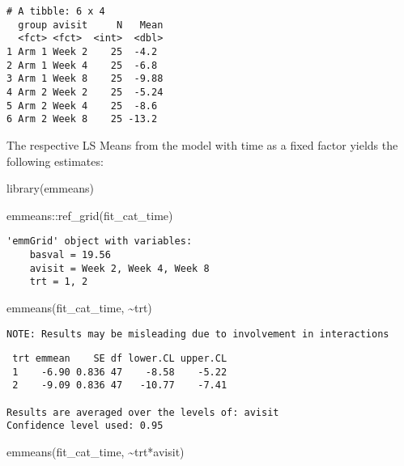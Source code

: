 \documentclass[
  letterpaper,
  DIV=11,
  numbers=noendperiod]{scrreprt}
\newenvironment{Shaded}{\begin{snugshade}}{\end{snugshade}}
\newcommand{\FunctionTok}[1]{\textcolor[rgb]{0.28,0.35,0.67}{#1}}
\newcommand{\NormalTok}[1]{\textcolor[rgb]{0.00,0.23,0.31}{#1}}
\newcommand{\SpecialCharTok}[1]{\textcolor[rgb]{0.37,0.37,0.37}{#1}}
\begin{document}
\begin{verbatim}
# A tibble: 6 x 4
  group avisit     N   Mean
  <fct> <fct>  <int>  <dbl>
1 Arm 1 Week 2    25  -4.2 
2 Arm 1 Week 4    25  -6.8 
3 Arm 1 Week 8    25  -9.88
4 Arm 2 Week 2    25  -5.24
5 Arm 2 Week 4    25  -8.6 
6 Arm 2 Week 8    25 -13.2 
\end{verbatim}

The respective LS Means from the model with time as a fixed factor
yields the following estimates:

\begin{Shaded}
\begin{Highlighting}[]
\FunctionTok{library}\NormalTok{(emmeans)}

\NormalTok{emmeans}\SpecialCharTok{::}\FunctionTok{ref\_grid}\NormalTok{(fit\_cat\_time)}
\end{Highlighting}
\end{Shaded}

\begin{verbatim}
'emmGrid' object with variables:
    basval = 19.56
    avisit = Week 2, Week 4, Week 8
    trt = 1, 2
\end{verbatim}

\begin{Shaded}
\begin{Highlighting}[]
\FunctionTok{emmeans}\NormalTok{(fit\_cat\_time, }\SpecialCharTok{\textasciitilde{}}\NormalTok{trt)}
\end{Highlighting}
\end{Shaded}

\begin{verbatim}
NOTE: Results may be misleading due to involvement in interactions
\end{verbatim}

\begin{verbatim}
 trt emmean    SE df lower.CL upper.CL
 1    -6.90 0.836 47    -8.58    -5.22
 2    -9.09 0.836 47   -10.77    -7.41

Results are averaged over the levels of: avisit 
Confidence level used: 0.95 
\end{verbatim}

\begin{Shaded}
\begin{Highlighting}[]
\FunctionTok{emmeans}\NormalTok{(fit\_cat\_time, }\SpecialCharTok{\textasciitilde{}}\NormalTok{trt}\SpecialCharTok{*}\NormalTok{avisit)}
\end{Highlighting}
\end{Shaded}
\end{document}
